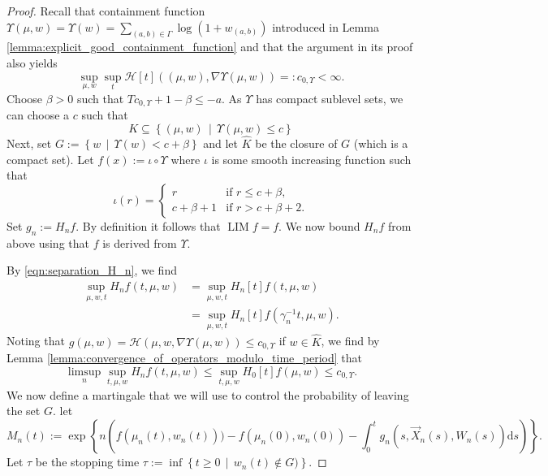\documentclass[a4paper]{article}
\newcommand{\cH}{\mathcal{H}}
\newcommand{\dd}{ \mathrm{d}}
\DeclareMathOperator*{\LIM}{LIM}
\numberwithin{equation}{section}
\theoremstyle{definition}
\begin{document}
\begin{proof}
	Recall that containment function $\Upsilon(\mu,w) = \Upsilon(w) = \sum_{(a,b) \in \Gamma} \log (1 + w_{(a,b)})$ introduced in Lemma \ref{lemma:explicit_good_containment_function} and that the argument in its proof also yields
	\begin{equation*}
		\sup_{\mu,w} \sup_{t}\cH[t]((\mu,w),\nabla \Upsilon(\mu,w)) =: c_{0,\Upsilon} < \infty.
	\end{equation*}
	Choose $\beta > 0$ such that $Tc_{0,\Upsilon} + 1 - \beta \leq -a$. As $\Upsilon$ has compact sublevel sets, we can choose a $c$ such that
	\begin{equation*}
		K \subseteq \left\{(\mu,w) \, \middle| \, \Upsilon(\mu,w) \leq c \right\}
	\end{equation*}
	Next, set $G := \left\{w \, \middle| \, \Upsilon(w) < c + \beta \right\}$ and let $\hat{K}$ be the closure of $G$ (which is a compact set). Let $f(x) := \iota \circ \Upsilon $ where $\iota$ is some smooth increasing function such that
	\begin{equation*}
		\iota(r) = \begin{cases}
			r & \text{if } r \leq c + \beta, \\
			c+ \beta + 1 & \text{if } r > c+ \beta + 2.
		\end{cases}
	\end{equation*}
	Set $g_n := H_n f$. By definition it follows that $\LIM f = f$. We now bound $H_n f$ from above using that $f$ is derived from $\Upsilon$.
	
	
	By \eqref{eqn:separation_H_n}, we find
	\begin{align*}
		\sup_{\mu,w,t} H_n f(t,\mu,w) &  = \sup_{\mu,w,t} H_n[t] f(t,\mu,w) \\
		& = \sup_{\mu,w,t} H_n[t] f(\gamma_n^{-1} t,\mu,w).
	\end{align*}
	Noting that $g(\mu,w) = \cH(\mu,w, \nabla \Upsilon(\mu,w)) \leq c_{0,\Upsilon}$ if $w \in \hat{K}$, we find by Lemma \ref{lemma:convergence_of_operators_modulo_time_period} that
	\begin{equation} \label{eqn:upper_bound_HUpsilon_limsup}
		\limsup_n \sup_{t,\mu,w} H_n f(t,\mu,w) \leq \sup_{t,\mu,w} H_0[t] f(\mu,w) \leq c_{0,\Upsilon}.
	\end{equation} 
	We now define a martingale that we will use to control the probability of leaving the set $G$. let
	\begin{equation*}
		M_n(t) := \exp \left\{n \left( f(\mu_n(t),w_n(t))) - f(\mu_n(0),w_n(0)) - \int_0^t g_n(s,\vec{X}_n(s),W_n(s))\dd s \right) \right\}.
	\end{equation*}
	Let $\tau$ be the stopping time $\tau := \inf \left\{t \geq 0 \, \middle| \, w_n(t) \notin  G) \right\}$.
	

\end{proof}
\end{document}
